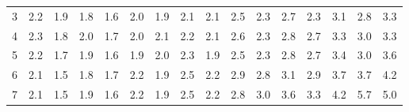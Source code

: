 \begin{table}[!htbp]
{\begin{tabular}{c|ccccccccccccccc}
        \rowcolor[HTML]{FFFFFF} 
        3                          & \multicolumn{1}{l|}{\cellcolor[HTML]{FFFFFF}2.2} & \cellcolor[HTML]{CCC0DA}1.9 & \cellcolor[HTML]{CCC0DA}1.8 & \cellcolor[HTML]{CCC0DA}1.6 & \cellcolor[HTML]{CCC0DA}2.0 & \multicolumn{1}{l|}{\cellcolor[HTML]{CCC0DA}1.9} & 2.1                        & 2.1                         & 2.5                         & 2.3                         & 2.7                         & 2.3                         & 3.1                         & 2.8                         & 3.3                         \\
        \rowcolor[HTML]{FFFFFF} 
        4                          & \multicolumn{1}{l|}{\cellcolor[HTML]{FFFFFF}2.3} & \cellcolor[HTML]{CCC0DA}1.8 & \cellcolor[HTML]{CCC0DA}2.0 & \cellcolor[HTML]{CCC0DA}1.7 & \cellcolor[HTML]{CCC0DA}2.0 & \multicolumn{1}{l|}{\cellcolor[HTML]{FFFFFF}2.1} & 2.2                        & 2.1                         & 2.6                         & 2.3                         & 2.8                         & 2.7                         & 3.3                         & 3.0                         & 3.3                         \\
        \rowcolor[HTML]{FFFFFF} 
        5                          & \multicolumn{1}{l|}{\cellcolor[HTML]{FFFFFF}2.2} & \cellcolor[HTML]{CCC0DA}1.7 & \cellcolor[HTML]{CCC0DA}1.9 & \cellcolor[HTML]{CCC0DA}1.6 & \cellcolor[HTML]{CCC0DA}1.9 & \multicolumn{1}{l|}{\cellcolor[HTML]{CCC0DA}2.0} & 2.3                        & \cellcolor[HTML]{CCC0DA}1.9 & 2.5                         & 2.3                         & 2.8                         & 2.7                         & 3.4                         & 3.0                         & 3.6                         \\
        \rowcolor[HTML]{FFFFFF} 
        6                          & \multicolumn{1}{l|}{\cellcolor[HTML]{FFFFFF}2.1} & \cellcolor[HTML]{B1A0C7}1.5 & \cellcolor[HTML]{CCC0DA}1.8 & \cellcolor[HTML]{CCC0DA}1.7 & 2.2                         & \multicolumn{1}{l|}{\cellcolor[HTML]{CCC0DA}1.9} & 2.5                        & 2.2                         & 2.9                         & 2.8                         & 3.1                         & 2.9                         & 3.7                         & 3.7                         & 4.2                         \\
        \rowcolor[HTML]{FFFFFF} 
        7                          & \multicolumn{1}{l|}{\cellcolor[HTML]{FFFFFF}2.1} & \cellcolor[HTML]{CCC0DA}1.5 & \cellcolor[HTML]{CCC0DA}1.9 & \cellcolor[HTML]{CCC0DA}1.6 & 2.2                         & \multicolumn{1}{l|}{\cellcolor[HTML]{CCC0DA}1.9} & 2.5                        & 2.2                         & 2.8                         & 3.0                         & 3.6                         & 3.3                       & 4.2                         & 5.7                         & 5.0                         \\

\end{tabular}}
\end{table}
